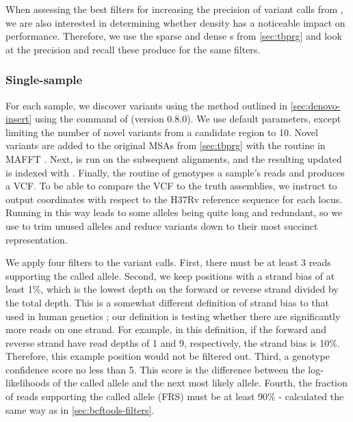 When assessing the best filters for increasing the precision of variant calls from \pandora{}, we are also interested in determining whether \panrg{} density has a noticeable impact on performance. Therefore, we use the sparse and dense \panrg{}s from \autoref{sec:tbprg} and look at the precision and recall these produce for the same filters.

\subsubsection{Single-sample}
\label{sec:map-var-calls}

For each sample, we discover \denovo{} variants using the method outlined in \autoref{sec:denovo-insert} using the  command of \pandora{} (version 0.8.0). We use default parameters, except limiting the number of novel variants from a candidate region to 10. Novel variants are added to the original MSAs from \autoref{sec:tbprg} with the  routine in MAFFT \cite{katoh2012}. Next, \makeprg{} is run on the subsequent alignments, and the resulting updated \panrg{} is indexed with \pandora{}. Finally, the  routine of \pandora{} genotypes a sample's reads and produces a VCF. To be able to compare the \pandora{} VCF to the truth assemblies, we instruct \pandora{} to output coordinates with respect to the H37Rv reference sequence for each locus. Running \pandora{} in this way leads to some alleles being quite long and redundant, so we use  to trim unused alleles and reduce variants down to their most succinct representation. 

We apply four filters to the \pandora{} variant calls. First, there must be at least 3 reads supporting the called allele. Second, we keep positions with a strand bias of at least 1\%, which is the lowest depth on the forward or reverse strand divided by the total depth. This is a somewhat different definition of strand bias to that used in human genetics \cite{guo2012effect}; our definition is testing whether there are significantly more reads on one strand. For example, in this definition, if the forward and reverse strand have read depths of 1 and 9, respectively, the strand bias is 10\%. Therefore, this example position would not be filtered out. Third, a genotype confidence score no less than 5. This score is the difference between the log-likelihoods of the called allele and the next most likely allele. Fourth, the fraction of reads supporting the called allele (FRS) must be at least 90\%  - calculated the same way as in \autoref{sec:bcftools-filters}.

